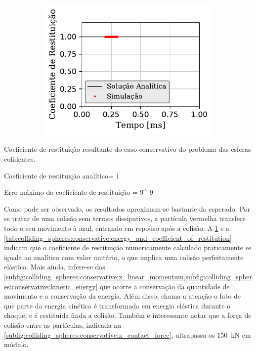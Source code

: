 \begin{figure}[htb!]
{\begin{subfigure}[t]{\smallresultsfigwidth}
			\includegraphics[scale=1]{images/colliding_spheres/conservative/coefficient_of_restitution_small.pdf}
			\caption{}
			\label{subfig:colliding_spheres:conservative:coefficient_of_restitution}
		\end{subfigure}
	}
	\label{fig:colliding_spheres:conservative:linear_momentum_force_kinetic_energy_and_coefficient_of_restitution}
	\sourceMe
\end{figure}

\begin{table}[h]
\centering
\caption{Coeficiente de restituição resultante do caso conservativo do problema das esferas colidentes.}
\label{tab:colliding_spheres:conservative:energy_and_coefficient_of_restitution}
\begin{parametersdesc}
	\item{Coeficiente de restituição analítico}{\coefficientOfRestitution = 1}{}
	\item{Erro máximo do coeficiente de restituição}{\maximumErrorOf{\coefficientOfRestitution} = 9^{-9}}{}
\end{parametersdesc}
\sourceMe 
\end{table}

Como pode ser observado, os resultados aproximam-se bastante do esperado. Por se tratar de uma colisão sem termos dissipativos, a partícula vermelha transfere todo o seu movimento à azul, entrando em repouso após a colisão. A \cref{subfig:colliding_spheres:conservative:coefficient_of_restitution} e a \cref{tab:colliding_spheres:conservative:energy_and_coefficient_of_restitution} indicam que o coeficiente de restituição numericamente calculado praticamente se iguala ao analítico com valor unitário, o que implica uma colisão perfeitamente elástica. Mais ainda, infere-se das \cref{subfig:colliding_spheres:conservative:x_linear_momentum,subfig:colliding_spheres:conservative:kinetic_energy} que ocorre a conservação da quantidade de movimento e a conservação da energia. Além disso, chama a atenção o fato de que parte da energia cinética é transformada em energia elástica durante o choque, e é restituída finda a colisão. Também é interessante notar que a força de colisão entre as partículas, indicada na \cref{subfig:colliding_spheres:conservative:x_contact_force}, ultrapassa os \SI{150}{\kilo\newton} em módulo.

